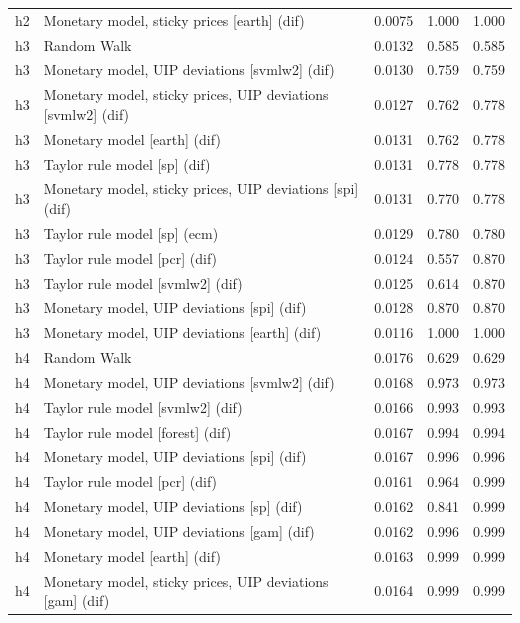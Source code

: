 \begin{ThreePartTable}
\begin{longtable}[t]{cp{5.5cm}ccc}
h2 & \raggedright Monetary model, sticky prices [earth] (dif) & 0.0075 & 1.000 & 1.000\\
\addlinespace
h3 & \raggedright Random Walk & 0.0132 & 0.585 & 0.585\\
h3 & \raggedright Monetary model, UIP deviations [svmlw2] (dif) & 0.0130 & 0.759 & 0.759\\
h3 & \raggedright Monetary model, sticky prices, UIP deviations [svmlw2] (dif) & 0.0127 & 0.762 & 0.778\\
h3 & \raggedright Monetary model [earth] (dif) & 0.0131 & 0.762 & 0.778\\
h3 & \raggedright Taylor rule model [sp] (dif) & 0.0131 & 0.778 & 0.778\\
h3 & \raggedright Monetary model, sticky prices, UIP deviations [spi] (dif) & 0.0131 & 0.770 & 0.778\\
h3 & \raggedright Taylor rule model [sp] (ecm) & 0.0129 & 0.780 & 0.780\\
h3 & \raggedright Taylor rule model [pcr] (dif) & 0.0124 & 0.557 & 0.870\\
h3 & \raggedright Taylor rule model [svmlw2] (dif) & 0.0125 & 0.614 & 0.870\\
h3 & \raggedright Monetary model, UIP deviations [spi] (dif) & 0.0128 & 0.870 & 0.870\\
h3 & \raggedright Monetary model, UIP deviations [earth] (dif) & 0.0116 & 1.000 & 1.000\\
\addlinespace
h4 & \raggedright Random Walk & 0.0176 & 0.629 & 0.629\\
h4 & \raggedright Monetary model, UIP deviations [svmlw2] (dif) & 0.0168 & 0.973 & 0.973\\
h4 & \raggedright Taylor rule model [svmlw2] (dif) & 0.0166 & 0.993 & 0.993\\
h4 & \raggedright Taylor rule model [forest] (dif) & 0.0167 & 0.994 & 0.994\\
h4 & \raggedright Monetary model, UIP deviations [spi] (dif) & 0.0167 & 0.996 & 0.996\\
h4 & \raggedright Taylor rule model [pcr] (dif) & 0.0161 & 0.964 & 0.999\\
h4 & \raggedright Monetary model, UIP deviations [sp] (dif) & 0.0162 & 0.841 & 0.999\\
h4 & \raggedright Monetary model, UIP deviations [gam] (dif) & 0.0162 & 0.996 & 0.999\\
h4 & \raggedright Monetary model [earth] (dif) & 0.0163 & 0.999 & 0.999\\
h4 & \raggedright Monetary model, sticky prices, UIP deviations [gam] (dif) & 0.0164 & 0.999 & 0.999\\

\end{longtable}
\end{ThreePartTable}
